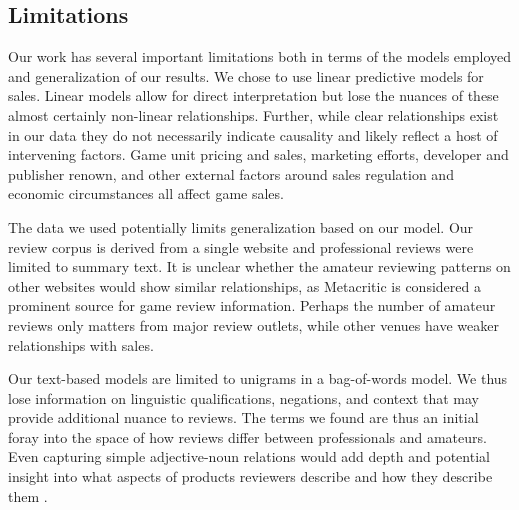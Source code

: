 \documentclass{sig-alternate}
\begin{document}

\subsection{Limitations}
Our work has several important limitations both in terms of the models
employed and generalization of our results. We chose to use linear
predictive models for sales. Linear models allow for direct
interpretation but lose the nuances of these almost certainly non-linear
relationships. Further, while clear relationships exist in our data they
do not necessarily indicate causality and likely reflect a host of
intervening factors. Game unit pricing and sales, marketing efforts,
developer and publisher renown, and other external factors around sales
regulation and economic circumstances all affect game sales. 

The data we used potentially limits generalization based on our model.
Our review corpus is derived from a single website and professional
reviews were limited to summary text. It is unclear whether the amateur
reviewing patterns on other websites would show similar relationships, as Metacritic is considered a prominent source for game review information. Perhaps the number of amateur reviews only matters from major review outlets, while other venues have weaker relationships with sales.

Our text-based models are limited to unigrams in a bag-of-words model.
We thus lose information on linguistic qualifications, negations, and
context that may provide additional nuance to reviews. The terms we
found are thus an initial foray into the space of how reviews differ
between professionals and amateurs. Even capturing simple adjective-noun
relations would add depth and potential insight into what aspects of
products reviewers describe and how they describe them \cite{zagal2011natural}.
\end{document}
